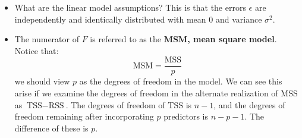 \documentclass[10pt]{article}
\newcommand{\eps}{\epsilon}
\begin{document}
\begin{enumerate}
{\begin{itemize}
			\noindent \textbf{Proof:} $$y_i - \overline{y} = (y_i - \hat y_i) + (\hat y_i - \overline{y}) $$
			Now square both sides and sum:
			$$\text{TSS} = \text{MSS} + \text{RSS} + \sum_{i = 1}^n 2(y_i - \hat y_i)(\hat y_i - \overline{y})$$
			We want to show the last sum is 0.  By simple linear regression, we know that:
			$$\hat y_i = \hat\beta_0 + \hat\beta_1 x_i$$
			where 
			$$\hat \beta_0 = \overline{y} - \hat\beta_1\overline{x}, \hspace{.2in} \text{and} \hspace{.2in} 
			\hat\beta_1 = \dfrac{ \sum_{i = 1}^n (x_i - \overline{x} )(y_i - \overline{y})}{\sum_{i = 1}^n (x_i - \overline{x} )^2}$$
			Therefore:
			\begin{align*}
			\sum_{i = 1}^n (y_i - \hat y_i)(\hat y_i - \overline{y}) &= \sum_{i = 1}^n (y_i - \hat \beta_0 - \hat \beta_1 x_i)(\hat \beta_0 + \hat \beta_1 x_i - \overline{y}) \\
			&= \sum_{i = 1}^n (y_i - \overline{y} + \hat\beta_1 \overline{x}  - \hat \beta_1 x_i)(\overline{y} - \hat\beta_1\overline{x} + \hat \beta_1 x_i - \overline{y}) \\
			&= \sum_{i = 1}^n \Big((y_i - \overline{y}) - \hat\beta_1 (x_i - \overline{x})  \Big)\Big( \hat\beta_1(x_i -\overline{x})\Big) \\
			&= \sum_{i = 1}^n \hat\beta_1 (x_i - \overline{x})(y_i - \overline{y}) - \hat\beta_1^2(x_i - \overline{x})^2 \\
			&= \hat\beta_1 \left[ \sum_{i = 1}^n (x_i - \overline{x})(y_i - \overline{y})  - \hat\beta_1 \sum_{i = 1}^n (x_i - \overline{x})^2 \right] \\ 
			&= \hat\beta_1 \left[ \sum_{i = 1}^n (x_i - \overline{x})(y_i - \overline{y})  - \dfrac{ \sum_{i = 1}^n (x_i - \overline{x} )(y_i - \overline{y})}{\sum_{i = 1}^n (x_i - \overline{x} )^2} \sum_{i = 1}^n (x_i - \overline{x})^2 \right] = 0\\
			\end{align*}
			\qed
			
			
			\item What are the linear model assumptions?  This is that the errors $\eps$ are independently and identically distributed with mean 0 and variance $\sigma^2$.
			\item The numerator of $F$ is referred to as the \textbf{MSM, mean square model}.  Notice that:$$\text{MSM} = \dfrac{\text{MSS}}{p}$$
			we should view $p$ as the degrees of freedom in the model.  We can see this arise if we examine the degrees of freedom in the alternate realization of $\text{MSS}$ as $\text{TSS} - \text{RSS}$.  The degrees of freedom of $\text{TSS}$ is $n - 1$, and the degrees of freedom remaining after incorporating $p$ predictors is $n - p - 1$.    The difference of these is $p$.
			

\end{itemize}}
\end{enumerate}
\end{document}
